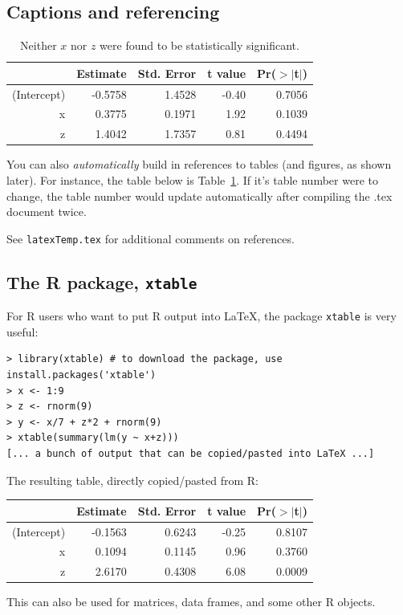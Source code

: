 \documentclass[11pt]{article} %
\begin{document}
\subsection{Captions and referencing}

\begin{table}[ht]
\begin{center}
\begin{tabular}{rrrrr}
  \hline
 & Estimate & Std. Error & t value & Pr($>$$|$t$|$) \\
  \hline
(Intercept) & -0.5758 & 1.4528 & -0.40 & 0.7056 \\
  x & 0.3775 & 0.1971 & 1.92 & 0.1039 \\
  z & 1.4042 & 1.7357 & 0.81 & 0.4494 \\
   \hline
\end{tabular}
\end{center}
\caption{Neither $x$ nor $z$ were found to be statistically significant.}
\label{multRegression}
\end{table}

You can also \emph{automatically} build in references to tables (and figures, as shown later). For instance, the table below is Table~\ref{multRegression}. If it's table number were to change, the table number would update automatically after compiling the .tex document twice.

See \texttt{latexTemp.tex} for additional comments on references.

\subsection{The R package, \texttt{xtable}}

For R users who want to put R output into LaTeX, the package \texttt{xtable} is very useful:
\begin{verbatim}
> library(xtable) # to download the package, use install.packages('xtable')
> x <- 1:9
> z <- rnorm(9)
> y <- x/7 + z*2 + rnorm(9)
> xtable(summary(lm(y ~ x+z)))
[... a bunch of output that can be copied/pasted into LaTeX ...]
\end{verbatim}
The resulting table, directly copied/pasted from R:
\begin{table}[ht]
\begin{center}
\begin{tabular}{rrrrr}
  \hline
 & Estimate & Std. Error & t value & Pr($>$$|$t$|$) \\
  \hline
(Intercept) & -0.1563 & 0.6243 & -0.25 & 0.8107 \\
  x & 0.1094 & 0.1145 & 0.96 & 0.3760 \\
  z & 2.6170 & 0.4308 & 6.08 & 0.0009 \\
   \hline
\end{tabular}
\end{center}
\end{table}
This can also be used for matrices, data frames, and some other R objects.
\end{document}
